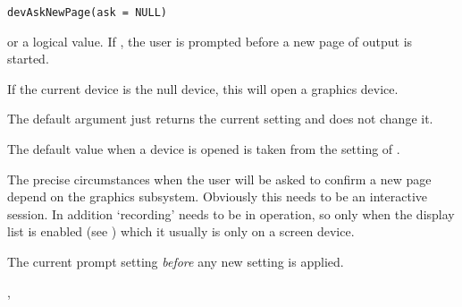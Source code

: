 %
\begin{Usage}
\begin{verbatim}
devAskNewPage(ask = NULL)
\end{verbatim}
\end{Usage}
%
\begin{Arguments}
\begin{ldescription}
\item[\code{ask}]  or a logical value.  If , the user
is prompted before a new page of output is started. 
\end{ldescription}
\end{Arguments}
%
\begin{Details}\relax
If the current device is the null device, this will open a graphics device.

The default argument just returns the current setting and does not
change it.

The default value when a device is opened is taken from the
setting of .

The precise circumstances when the user will be asked to confirm a new
page depend on the graphics subsystem.  Obviously this needs to be an
interactive session.  In addition `recording' needs to be in
operation, so only when the display list is enabled (see
) which it usually is only on a screen device.
\end{Details}
%
\begin{Value}
The current prompt setting \emph{before} any new setting is applied.
\end{Value}
%
\begin{SeeAlso}\relax
{}, 
\end{SeeAlso}
%
